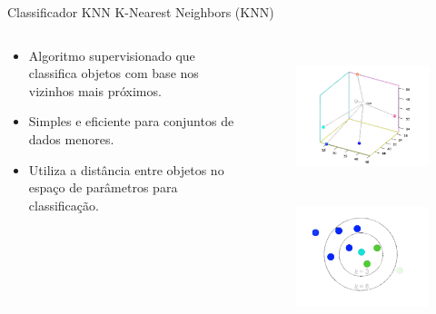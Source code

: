 \begin{frame}[c]{Classificador KNN}
    K-Nearest Neighbors (KNN) 
    \begin{columns}[c]
        \begin{column}{0.48\linewidth}
            \vspace{-1.5cm} %
            \begin{itemize}
                \item Algoritmo supervisionado que classifica objetos com base nos vizinhos mais próximos.
                \item Simples e eficiente para conjuntos de dados menores.
                \item Utiliza a distância entre objetos no espaço de parâmetros para classificação.
            \end{itemize}
        \end{column}
        \begin{column}{0.48\linewidth}
            \vspace{-1cm} %
            \begin{figure}
                \centering
                \includegraphics[height=4cm]{images/knn_example1.png}
                \includegraphics[height=4cm]{images/knn_example2.png}
            \end{figure}
        \end{column}
    \end{columns}
\end{frame}

